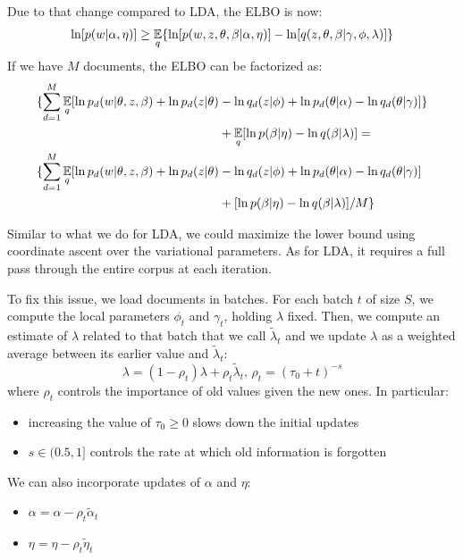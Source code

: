 Due to that change compared to LDA, the ELBO is now:
\begin{equation*}
    \ln [p(w | \alpha, \eta)] \geq \operatorname*{\mathbb{E}}_q\{ \ln [p(w, z, \theta, \beta | \alpha, \eta)] - \ln[q(z, \theta, \beta | \gamma, \phi, \lambda)] \}
\end{equation*}
If we have $M$ documents, the ELBO can be factorized as:
\begin{equation*}
    \begin{split}
        \{\sum_{d=1}^M \operatorname*{\mathbb{E}}_{q} [ \ln p_d(w | \theta, z, \beta) + \ln p_d(z | \theta) & - \ln q_d(z | \phi) + \ln p_d(\theta | \alpha) - \ln q_d(\theta | \gamma)]\} \\
        & + \operatorname*{\mathbb{E}}_q[\ln p(\beta | \eta) - \ln q(\beta | \lambda)] = \\
        \{\sum_{d=1}^M \operatorname*{\mathbb{E}}_{q} [ \ln p_d(w | \theta, z, \beta) + \ln p_d(z | \theta) & - \ln q_d(z | \phi) + \ln p_d(\theta | \alpha) - \ln q_d(\theta | \gamma)] \\
        & + [\ln p(\beta | \eta) - \ln q(\beta | \lambda)]/M \} \\
    \end{split}
\end{equation*}

Similar to what we do for LDA, we could maximize the lower bound using coordinate ascent over the variational parameters.
As for LDA, it requires a full pass through the entire corpus at each iteration.

To fix this issue, we load documents in batches. For each batch $t$ of size $S$, we compute the local parameters $\phi_t$ and $\gamma_t$, holding $\lambda$ fixed.
Then, we compute an estimate of $\lambda$ related to that batch that we call $\tilde{\lambda}_t$
and we update $\lambda$ as a weighted average between its earlier value and $\tilde{\lambda}_t$:
\begin{equation*}
    \lambda = (1 - \rho_t) \lambda + \rho_t \tilde{\lambda}_t, \, \rho_t = (\tau_0 + t)^{-s}
\end{equation*}
where $\rho_t$ controls the importance of old values given the new ones. In particular:
\begin{itemize}
    \item increasing the value of $\tau_0 \geq 0$ slows down the initial updates
    \item $s \in (0.5, 1]$ controls the rate at which old information is forgotten
\end{itemize}

We can also incorporate updates of $\alpha$ and $\eta$:
\begin{itemize}
    \item $\alpha = \alpha - \rho_t \tilde{\alpha}_t$
    \item $\eta = \eta - \rho_t \tilde{\eta}_t$
\end{itemize}

